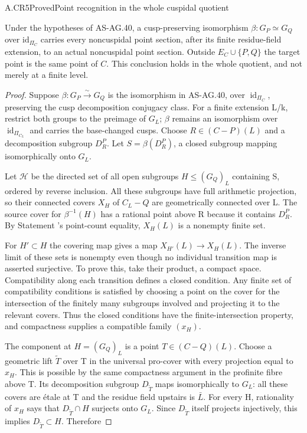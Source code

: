 \begin{claim}{A.CR5}{Proved}{Point recognition in the whole cuspidal quotient}

Under the hypotheses of AS-AG.40, a cusp-preserving isomorphism
$\beta:G_P\simeq G_Q$ over $\mathrm{id}_{\Pi_C}$ carries every
noncuspidal point section, after its finite residue-field extension,
to an actual noncuspidal point section. Outside $E_C\cup\{P,Q\}$ the
target point is the same point of $C$. This conclusion holds in the
whole quotient, and not merely at a finite level.

\end{claim}

\begin{proof}

Suppose \(\beta:G_P\xrightarrow\sim G_Q\) is the isomorphism in AS-AG.40, over \(\operatorname{id}_{{\Pi}_C}\), preserving the cusp decomposition conjugacy class. For a finite extension L/k, restrict both groups to the preimage of \(G_L\); \({\beta}\) remains an isomorphism over \(\operatorname{id}_{{\Pi}_{C_L}}\) and carries the base-changed cusps. Choose \(R{\in}(C-P)(L)\) and a decomposition subgroup \(D_R^P\). Let \(S={\beta}(D_R^P)\), a closed subgroup mapping isomorphically onto \(G_L\).

Let \(\mathcal H\) be the directed set of all open subgroups \(H{\le}(G_Q)_L\) containing S, ordered by reverse inclusion. All these subgroups have full arithmetic projection, so their connected covers \(X_H\) of \(C_L-Q\) are geometrically connected over L. The source cover for \({\beta}^{-1}(H)\) has a rational point above R because it contains \(D_R^P\). By Statement 's point-count equality, \(X_H(L)\) is a nonempty finite set.

For \(H'{\subset}H\) the covering map gives a map \(X_{H'}(L){\to}X_H(L)\). The inverse limit of these sets is nonempty even though no individual transition map is asserted surjective. To prove this, take their product, a compact space. Compatibility along each transition defines a closed condition. Any finite set of compatibility conditions is satisfied by choosing a point on the cover for the intersection of the finitely many subgroups involved and projecting it to the relevant covers. Thus the closed conditions have the finite-intersection property, and compactness supplies a compatible family \((x_H)\).

The component at \(H=(G_Q)_L\) is a point \(T{\in}(C-Q)(L)\). Choose a geometric lift \(\widetilde T\) over T in the universal pro-cover with every projection equal to \(x_H\). This is possible by the same compactness argument in the profinite fibre above T. Its decomposition subgroup \(D_{\widetilde T}\) maps isomorphically to \(G_L\): all these covers are étale at T and the residue field upstairs is \(\bar L\). For every H, rationality of \(x_H\) says that \(D_{\widetilde T}{\cap}H\) surjects onto \(G_L\). Since \(D_{\widetilde T}\) itself projects injectively, this implies \(D_{\widetilde T}{\subset}H\). Therefore


\end{proof}
